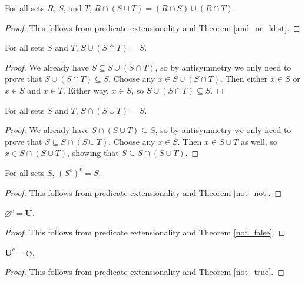 \documentclass[../math.tex]{subfiles}
\begin{document}
\begin{theorem} \label{inter_ldist}
    For all sets $R$, $S$, and $T$, $R \cap (S \cup T) = (R \cap S) \cup (R \cap
    T)$.
\end{theorem}
\begin{proof}
    This follows from predicate extensionality and Theorem \ref{and_or_ldist}.
\end{proof}

\begin{theorem} \label{union_inter_self}
    For all sets $S$ and $T$, $S \cup (S \cap T) = S$.
\end{theorem}
\begin{proof}
    We already have $S \subseteq S \cup (S \cap T)$, so by antisymmetry we only
    need to prove that $S \cup (S \cap T) \subseteq S$.  Choose any $x \in S
    \cup (S \cap T)$.  Then either $x \in S$ or $x \in S$ and $x \in T$.  Either
    way, $x \in S$, so $S \cup (S \cap T) \subseteq S$.
\end{proof}

\begin{theorem} \label{inter_union_self}
    For all sets $S$ and $T$, $S \cap (S \cup T) = S$.
\end{theorem}
\begin{proof}
    We already have $S \cap (S \cup T) \subseteq S$, so by antisymmetry we only
    need to prove that $S \subseteq S \cap (S \cup T)$.  Choose any $x \in S$.
    Then $x \in S \cup T$ as well, so $x \in S \cap (S \cup T)$, showing that $S
    \subseteq S \cap (S \cup T)$.
\end{proof}

\begin{theorem} \label{compl_compl}
    For all sets $S$, $(S^c)^c = S$.
\end{theorem}
\begin{proof}
    This follows from predicate extensionality and Theorem \ref{not_not}.
\end{proof}

\begin{theorem} \label{compl_empty}
    $\varnothing^c = \bm U$.
\end{theorem}
\begin{proof}
    This follows from predicate extensionality and Theorem \ref{not_false}.
\end{proof}

\begin{theorem} \label{compl_all}
    $\bm U^c = \varnothing$.
\end{theorem}
\begin{proof}
    This follows from predicate extensionality and Theorem \ref{not_true}.
\end{proof}
\end{document}
